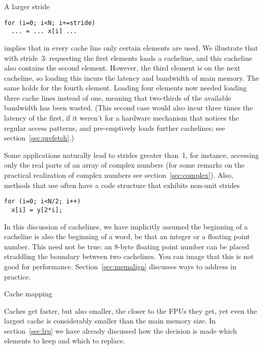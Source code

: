 %
A larger stride 
\begin{verbatim}
for (i=0; i<N; i+=stride)
  ... = ... x[i] ...
\end{verbatim}
implies that in every cache line only certain elements
are used. We illustrate that with stride~3: requesting the first
elements loads a cacheline, and this cacheline also contains the
second element. However, the third element is on the next cacheline,
so loading this incurs the latency and bandwidth of main memory. The
same holds for the fourth element. Loading four elements now needed
loading three cache lines instead of one, meaning that two-thirds of
the available bandwidth has been wasted. (This second case would also incur
three times the latency of the first, if it weren't for a hardware
mechanism that notices the regular access patterns, and pre-emptively
loads further cachelines; see section~\ref{sec:prefetch}.)

Some applications naturally lead to strides greater than~1, for
instance, accessing only the real parts of an array of complex
numbers (for some remarks on the practical realization of complex
numbers see section~\ref{sec:complex}). Also, methods that use
 often have a code structure that
exhibits non-unit strides
\begin{verbatim}
for (i=0; i<N/2; i++)
  x[i] = y[2*i];
\end{verbatim}

In this discussion of cachelines, we have implicitly assumed the
beginning of a cacheline is also the beginning of a word, be that an
integer or a floating point number. This need not be true: an 8-byte
floating point number can be placed straddling the boundary between
two cachelines. You can image that this is not good for
performance. Section~\ref{sec:memalign} discusses ways to address
in practice.


 {Cache mapping}

Caches get faster, but also smaller, the closer to the \acp{FPU} they
get, yet even the largest cache is considerably smaller than the main
memory size. In section~\ref{sec:lru} we have already discussed how
the decision is made which elements to keep and which to replace.

